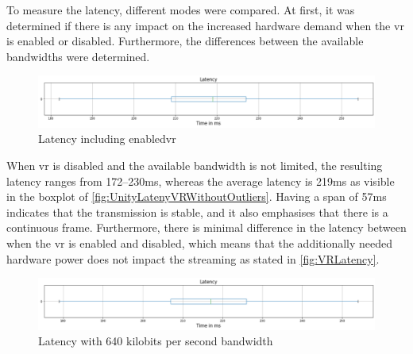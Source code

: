 \par 
To measure the latency, different modes were compared. At first, it was determined if there is any impact on the increased hardware demand when the \gls{vr} is enabled or disabled. Furthermore, the differences between the available bandwidths were determined.

\begin{figure}[htbp]
    \includegraphics[width=\textwidth,height=\textheight,keepaspectratio]{logos/Unity3dVRWithoutOutliers.png}
    \caption{Latency including enabled\gls{vr}}
    \label{fig:VRLatency}
\end{figure}

\par
When \gls{vr} is disabled and the available bandwidth is not limited, the resulting latency ranges from 172–230ms, whereas the average latency is 219ms as visible in the boxplot of \autoref{fig:UnityLatenyVRWithoutOutliers}. Having a span of 57ms indicates that the transmission is stable, and it also emphasises that there is a continuous frame. Furthermore, there is minimal difference in the latency between when the \gls{vr} is enabled and disabled, which means that the additionally needed hardware power does not impact the streaming as stated in \autoref{fig:VRLatency}.

\begin{figure}[htbp]
    \includegraphics[width=\textwidth,height=\textheight,keepaspectratio]{logos/LowBandwidth.png}
    \caption{Latency with 640 kilobits per second bandwidth}
    \label{fig:lowbandwidthlatency}
\end{figure}

